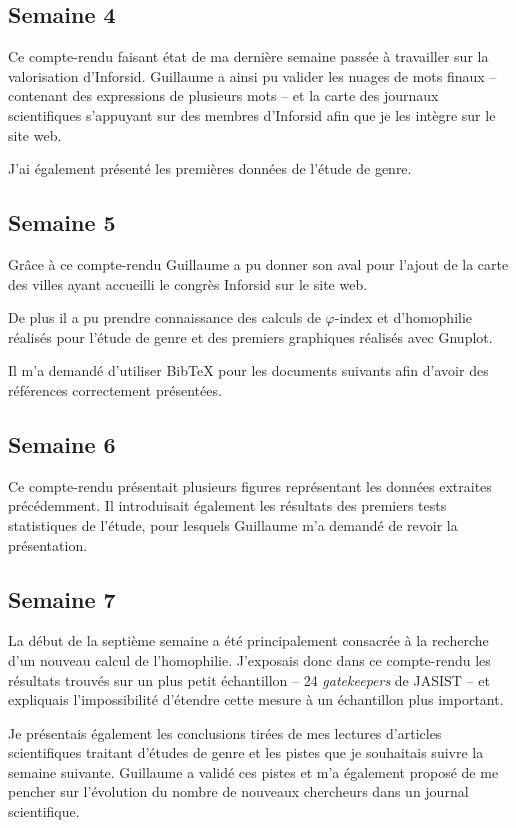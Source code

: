 	
	\subsection{Semaine 4}
		Ce compte-rendu faisant état de ma dernière semaine passée à travailler sur la valorisation d'Inforsid. Guillaume a ainsi pu valider les nuages de mots finaux -- contenant des expressions de plusieurs mots -- et la carte des journaux scientifiques s'appuyant sur des membres d'Inforsid afin que je les intègre sur le site web.
		
		J'ai également présenté les premières données de l'étude de genre.
	
	
	\subsection{Semaine 5}
		Grâce à ce compte-rendu Guillaume a pu donner son aval pour l'ajout de la carte des villes ayant accueilli le congrès Inforsid sur le site web.
		
		De plus il a pu prendre connaissance des calculs de $\varphi$-index et d'homophilie réalisés pour l'étude de genre et des premiers graphiques réalisés avec Gnuplot.
		
		Il m'a demandé d'utiliser BibTeX pour les documents suivants afin d'avoir des références correctement présentées.
	
	
	\subsection{Semaine 6}
		Ce compte-rendu présentait plusieurs figures représentant les données extraites précédemment. Il introduisait également les résultats des premiers tests statistiques de l'étude, pour lesquels Guillaume m'a demandé de revoir la présentation.
	
	
	\subsection{Semaine 7}
		La début de la septième semaine a été principalement consacrée à la recherche d'un nouveau calcul de l'homophilie. J'exposais donc dans ce compte-rendu les résultats trouvés sur un plus petit échantillon -- 24 \textit{gatekeepers} de JASIST -- et expliquais l'impossibilité d'étendre cette mesure à un échantillon plus important.
		
		Je présentais également les conclusions tirées de mes lectures d'articles scientifiques traitant d'études de genre et les pistes que je souhaitais suivre la semaine suivante. Guillaume a validé ces pistes et m'a également proposé de me pencher sur l'évolution du nombre de nouveaux chercheurs dans un journal scientifique.
	
